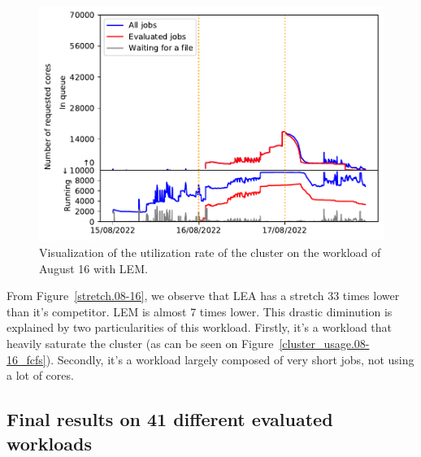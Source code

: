 \documentclass[conference,10pt]{IEEEtran}
\begin{document}
\begin{figure}[H]\centering\includegraphics[scale=0.47]{../MBSS/plot/Cluster_usage/2022-08-16->2022-08-16_V10000_Fcfs_with_a_score_mixed_strategy_x500_x1_x0_x0_Used_nodes_Reduced_450_128_32_256_4_1024_core_by_core.pdf}\caption{Visualization of the utilization rate of the cluster on the workload of August 16 with LEM.}
\label{cluster_usage.08-16_lem}\end{figure}

From Figure~\ref{stretch.08-16}, we observe that LEA has a stretch 33 times lower than
it's competitor. LEM is almost 7 times lower. This drastic diminution is explained
by two particularities of this workload. Firstly, it's a workload that heavily saturate the cluster (as can be seen on Figure~\ref{cluster_usage.08-16_fcfs}).
Secondly, it's a workload largely composed of very short jobs, not using a lot of cores.


\subsection{Final results on 41 different evaluated workloads}
\end{document}
